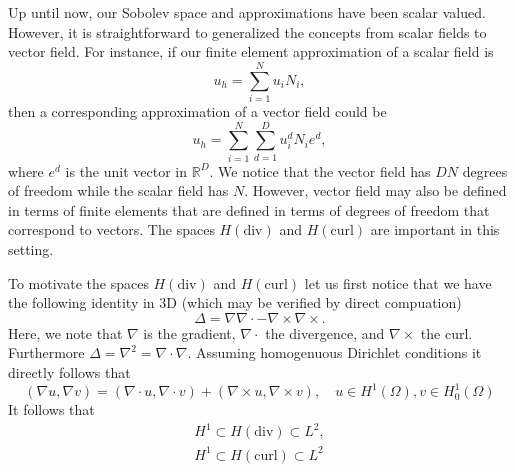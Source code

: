 Up until now, our Sobolev space and approximations have been scalar valued. However, it is straightforward to generalized the concepts from scalar fields to vector field. 
For instance, if our finite element approximation of a scalar field is 
\[
u_h = \sum_{i=1}^N u_i N_i,  
\]
then a corresponding approximation of a vector field could be 
\[
u_h = \sum_{i=1}^N \sum_{d=1}^D  u^d_i N_i e^d,  
\]
where $e^d$ is the unit vector in $\mathbb{R}^D$. We notice that the vector field has $D N$ degrees of freedom while the scalar field has $N$.  
However, vector field may also be defined in terms of finite elements that are defined in terms of degrees of freedom that
correspond to vectors.  The spaces $H(\mbox{div})$ and $H(\mbox{curl})$ are important in this setting.  

To motivate the spaces $H(\mbox{div})$ and $H(\mbox{curl})$ let us first notice that we have the
following identity  in 3D (which may be verified by direct compuation)
\[
\Delta = \nabla \nabla \cdot - \nabla\times \nabla \times.   
\]
Here, we note that $\nabla$ is the gradient, $\nabla\cdot$ the divergence, and $\nabla\times$ the curl.  
Furthermore $\Delta = \nabla^2 = \nabla\cdot\nabla$. Assuming homogenuous Dirichlet conditions
it directly follows that 
\[
(\nabla u, \nabla v) = (\nabla \cdot u, \nabla \cdot v)  + (\nabla\times u,  \nabla \times v), \quad u\in H^1(\Omega), v\in H_0^1(\Omega)     
\]
It follows that
\begin{align*}
H^1 \subset H(\mbox{div}) \subset L^2, \\   
H^1 \subset H(\mbox{curl}) \subset L^2   
\end{align*}



